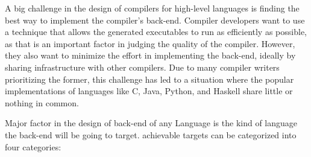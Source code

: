 \documentclass[openany]{book}
\begin{document}
	A  big  challenge  in  the  design  of  compilers  for  high-level  languages  is  finding  the  best
	way to implement the compiler's back-end.  Compiler developers want to use a technique
	that allows the generated executables to run as efficiently as possible, as that is an important
	factor in judging the quality of the compiler. However, they also want to minimize the effort
	in implementing the back-end, ideally by sharing infrastructure with other compilers. Due
	to many compiler writers prioritizing the former, this challenge has led to a situation where
	the popular implementations of languages like C, Java, Python, and Haskell share little or
	nothing in common.
	
	Major factor in the design of back-end of any Language is the kind of language the back-end will be going to target.
	achievable targets can be categorized into four categories:
	
\end{document}
